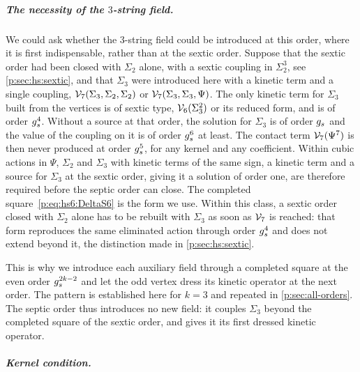 \subparagraph{The necessity of the $3$-string field.}

We could ask whether the $3$-string field could be introduced at this order, where it is first indispensable, rather than at the sextic order.
Suppose that the sextic order had been closed with $\Sigma_2$ alone, with a sextic coupling in $\Sigma_2^3$, see \cref{p:sec:hs:sextic}, and that $\Sigma_3$ were introduced here with a kinetic term and a single coupling, $\mathcal{V}_{7}(\Sigma_3, \Sigma_2, \Sigma_2)$ or $\mathcal{V}_{7}(\Sigma_3, \Sigma_3, \Psi)$.
The only kinetic term for $\Sigma_3$ built from the vertices is of sextic type, $\mathcal{V}_{6}(\Sigma_3^2)$ or its reduced form, and is of order $g_s^4$.
Without a source at that order, the solution for $\Sigma_3$ is of order $g_s$ and the value of the coupling on it is of order $g_s^6$ at least.
The contact term $\mathcal{V}_{7}(\Psi^7)$ is then never produced at order $g_s^5$, for any kernel and any coefficient.
Within cubic actions in $\Psi$, $\Sigma_2$ and $\Sigma_3$ with kinetic terms of the same sign, a kinetic term and a source for $\Sigma_3$ at the sextic order, giving it a solution of order one, are therefore required before the septic order can close.
The completed square~\eqref{p:eq:hs6:DeltaS6} is the form we use.
Within this class, a sextic order closed with $\Sigma_2$ alone has to be rebuilt with $\Sigma_3$ as soon as $\mathcal{V}_{7}$ is reached: that form reproduces the same eliminated action through order $g_s^4$ and does not extend beyond it, the distinction made in \cref{p:sec:hs:sextic}.

This is why we introduce each auxiliary field through a completed square at the even order $g_s^{2 k - 2}$ and let the odd vertex dress its kinetic operator at the next order.
The pattern is established here for $k = 3$ and repeated in \cref{p:sec:all-orders}.
The septic order thus introduces no new field: it couples $\Sigma_3$ beyond the completed square of the sextic order, and gives it its first dressed kinetic operator.

\subparagraph{Kernel condition.}

